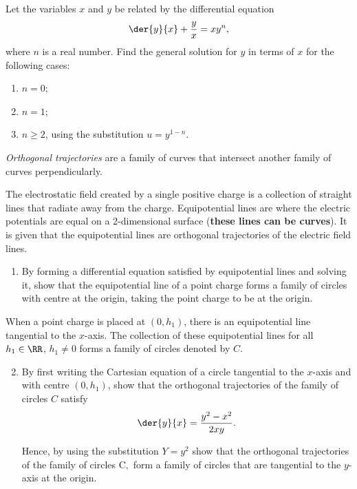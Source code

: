 \begin{problem}
    Let the variables $x$ and $y$ be related by the differential equation \[\der{y}{x} + \frac{y}{x} = xy^n,\] where $n$ is a real number. Find the general solution for $y$ in terms of $x$ for the following cases:
    \begin{enumerate}
        \item $n = 0$;
        \item $n = 1$;
        \item $n \geq 2$, using the substitution $u = y^{1-n}$.
    \end{enumerate}
\end{problem}

\begin{problem}
    \textit{Orthogonal trajectories} are a family of curves that intersect another family of curves perpendicularly.

    The electrostatic field created by a single positive charge is a collection of straight lines that radiate away from the charge. Equipotential lines are where the electric potentials are equal on a 2-dimensional surface (\textbf{these lines can be curves}). It is given that the equipotential lines are orthogonal trajectories of the electric field lines. 

    \begin{enumerate}
        \item By forming a differential equation satisfied by equipotential lines and solving it, show that the equipotential line of a point charge forms a family of circles with centre at the origin, taking the point charge to be at the origin.
    \end{enumerate}

    When a point charge is placed at $(0, h_1)$, there is an equipotential line tangential to the $x$-axis. The collection of these equipotential lines for all $h_1 \in \RR$, $h_1 \neq 0$ forms a family of circles denoted by $C$.

    \begin{enumerate}
        \setcounter{enumi}{1}
        \item By first writing the Cartesian equation of a circle tangential to the $x$-axis and with centre $(0, h_1)$, show that the orthogonal trajectories of the family of circles $C$ satisfy \[\der{y}{x} = \frac{y^2 - x^2}{2xy}.\]
        
        Hence, by using the substitution $Y = y^2$ show that the orthogonal trajectories of the family of circles C$,$ form a family of circles that are tangential to the $y$-axis at the origin.
    \end{enumerate}
\end{problem}